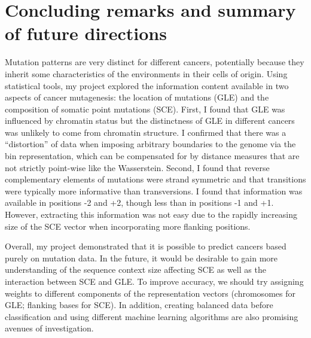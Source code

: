 \section{Concluding remarks and summary of future directions}\label{discussion:conclusion}
Mutation patterns are very distinct for different cancers, potentially because they inherit some characteristics of the environments in their cells of origin. Using statistical tools, my project explored the information content available in two aspects of cancer mutagenesis: the location of mutations (GLE) and the composition of somatic point mutations (SCE). First, I found that GLE was influenced by chromatin status but the distinctness of GLE in different cancers was unlikely to come from chromatin structure. I confirmed that there was a ``distortion'' of data when imposing arbitrary boundaries to the genome via the bin representation, which can be compensated for by distance measures that are not strictly point-wise like the Wasserstein. Second, I found that reverse complementary elements of mutations were strand symmetric and that transitions were typically more informative than transversions. I found that information was available in positions -2 and +2, though less than in positions -1 and +1. However, extracting this information was not easy due to the rapidly increasing size of the SCE vector when incorporating more flanking positions.

Overall, my project demonstrated that it is possible to predict cancers based purely on mutation data. In the future, it would be desirable to gain more understanding of the sequence context size affecting SCE as well as the interaction between SCE and GLE. To improve accuracy, we should try assigning weights to different components of the representation vectors (chromosomes for GLE; flanking bases for SCE). In addition, creating balanced data before classification and using different machine learning algorithms are also promising avenues of investigation.